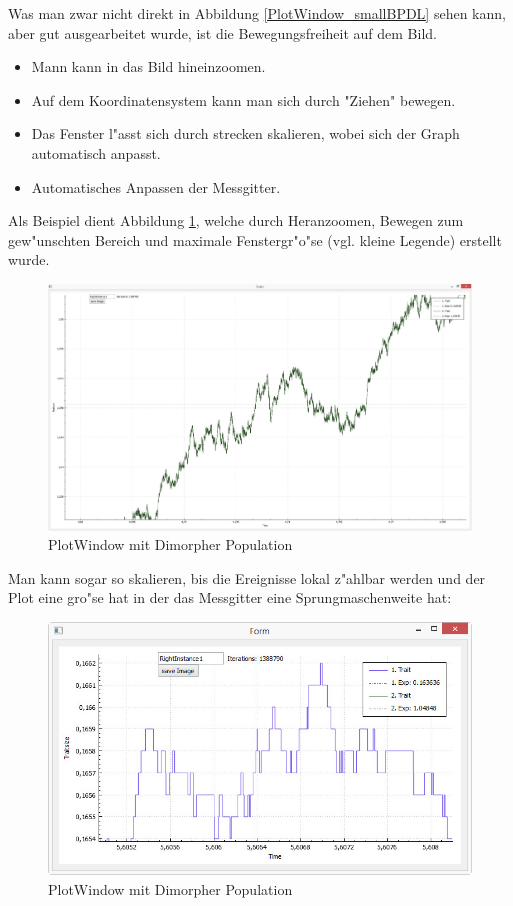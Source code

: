 \documentclass[11pt, a4paper, german]{article}
\theoremstyle{plain}
\begin{document}
	Was man zwar nicht direkt in Abbildung \ref{PlotWindow_smallBPDL} sehen kann, aber gut ausgearbeitet wurde, ist die Bewegungsfreiheit auf dem Bild.\\
	\begin{itemize}
		\item Mann kann in das Bild hineinzoomen.
		\item Auf dem Koordinatensystem kann man sich durch "{}Ziehen"{} bewegen.
		\item Das Fenster l"asst sich durch strecken skalieren, wobei sich der Graph automatisch anpasst.
		\item Automatisches Anpassen der Messgitter.
	\end{itemize}
	Als Beispiel dient Abbildung \ref{PlotWindow_zoomedBPDLmaximized}, welche durch Heranzoomen, Bewegen zum gew"unschten Bereich und maximale Fenstergr"o"se (vgl. kleine Legende) erstellt wurde.
	\begin{figure}[H]
		\centering
		\includegraphics[width=1\linewidth]{./Pictures/PlotWindow_zoomedBPDLmaximized}
		\caption[PlotWindow]{PlotWindow mit Dimorpher Population}
		\label{PlotWindow_zoomedBPDLmaximized}
	\end{figure}
	Man kann sogar so skalieren, bis die Ereignisse lokal z"ahlbar werden und der Plot eine gro"se hat in der das Messgitter eine Sprungmaschenweite hat:
	\begin{figure}[H]
		\centering
		\includegraphics[width=1\linewidth]{./Pictures/PlotWindow_zoomedBPDL_Stepview}
		\caption[PlotWindow]{PlotWindow mit Dimorpher Population}
		\label{PlotWindow_zoomedBPDL_Stepview}
	\end{figure}	
	
\end{document}

